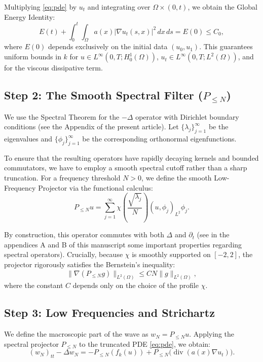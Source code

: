 \documentclass[11pt,letterpaper]{amsart}
\begin{document}
Multiplying \eqref{eq:pde} by $u_t$ and integrating over $\Omega \times (0,t)$, we obtain the Global Energy Identity:
\begin{equation}\label{eq:energia}
E(t) + \int_0^t \int_\Omega a(x) |\nabla u_t(s,x)|^2 \, dx \, ds = E(0) \le C_0,
\end{equation}
where $E(0)$ depends exclusively on the initial data $(u_0, u_1)$. This guarantees uniform bounds in $k$ for $u \in L^\infty(0,T; H_0^1(\Omega))$, $u_t \in L^\infty(0,T; L^2(\Omega))$, and for the viscous dissipative term.

\subsection{Step 2: The Smooth Spectral Filter ($P_{\le N}$)}

We use the Spectral Theorem for the $-\Delta$ operator with Dirichlet boundary conditions (see the Appendix of the present article). Let $\{\lambda_j\}_{j=1}^\infty$ be the eigenvalues and $\{\phi_j\}_{j=1}^\infty$ be the corresponding orthonormal eigenfunctions.

To ensure that the resulting operators have rapidly decaying kernels and bounded commutators, we have to employ a smooth spectral cutoff rather than a sharp truncation. For a frequency threshold $N > 0$, we define the smooth Low-Frequency Projector via the functional calculus:
\begin{equation}
P_{\le N} u = \sum_{j=1}^\infty \chi\left(\frac{\sqrt{\lambda_j}}{N}\right) (u, \phi_j)_{L^2} \phi_j.
\end{equation}

By construction, this operator commutes with both $\Delta$ and $\partial_t$ (see in the appendices A and B of this manuscript some important properties regarding spectral operators). Crucially, because $\chi$ is smoothly supported on $[-2, 2]$, the projector rigorously satisfies the Bernstein's inequality:
\begin{equation}
\|\nabla (P_{\le N} g)\|_{L^2(\Omega)} \le C N \|g\|_{L^2(\Omega)},
\end{equation}
where the constant $C$ depends only on the choice of the profile $\chi$.

\subsection{Step 3: Low Frequencies and Strichartz}

We define the macroscopic part of the wave as $w_N = P_{\le N} u$. Applying the spectral projector $P_{\le N}$ to the truncated PDE \eqref{eq:pde}, we obtain:
\begin{equation}\label{eq:baixa}
(w_N)_{tt} - \Delta w_N = - P_{\le N}(f_k(u)) + P_{\le N}\big( \operatorname{div}(a(x)\nabla u_t) \big).
\end{equation}
\end{document}
